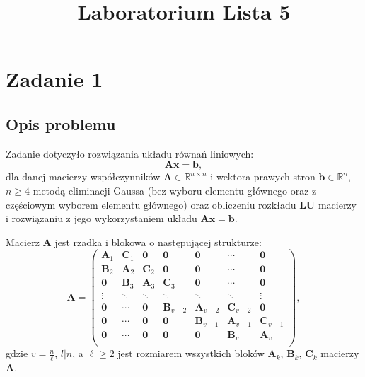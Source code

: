 \documentclass{classrep}
\author{
  \studentinfo{Agata Jasionowska}{229726}
}
\title{Laboratorium \ppauza Lista 5}
\newcommand{\mA}{\bm{A}}
\newcommand{\mB}{\bm{B}}
\newcommand{\mC}{\bm{C}}
\newcommand{\mL}{\bm{L}}
\newcommand{\mU}{\bm{U}}
\newcommand{\mZ}{\bm{0}}
\newcommand{\vb}{\bm{b}}
\newcommand{\vx}{\bm{x}}
\newcommand{\R}{\mathbb{R}}
\begin{document}
\maketitle

\section{Zadanie 1}	
	\subsection{Opis problemu}
		Zadanie dotyczyło rozwiązania układu równań liniowych:
		$$\mA\vx = \vb,$$
		dla danej macierzy współczynników $\mA \in \R^{n\times n}$ i wektora prawych stron $\vb \in \R^n$, $n \geq 4$ metodą eliminacji Gaussa 	(bez wyboru elementu głównego oraz z częściowym wyborem elementu głównego) oraz obliczeniu rozkładu $\mL \mU$ macierzy i rozwiązaniu z jego wykorzystaniem układu $\mA \vx = \vb$.
		
		Macierz $\mA$ jest rzadka i blokowa o następującej strukturze:
		$$
			\mA =
			\left(\begin{array}{ccccccc}
			\mA_1 & \mC_1 & \mZ & \mZ & \mZ & \cdots & \mZ \\
			\mB_2 & \mA_2 & \mC_2 & \mZ & \mZ  & \cdots & \mZ \\
			\mZ  & \mB_3 & \mA_3 & \mC_3 & \mZ  & \cdots & \mZ \\
			\vdots & \ddots & \ddots & \ddots & \ddots & \ddots & \vdots\\
			\mZ   & \cdots & \mZ  & \mB_{v-2} & \mA_{v-2} & \mC_{v-2} & \mZ \\
			\mZ  & \cdots & \mZ  &  \mZ &\mB_{v-1} & \mA_{v-1} & \mC_{v-1}  \\
			\mZ  & \cdots & \mZ & \mZ & \mZ& \mB_{v} & \mA_{v}  \\
			\end{array}\right),
		$$
		gdzie $v = \frac{n}{\ell}$, $l | n$, a $\ell \geq 2$ jest rozmiarem wszystkich bloków $\mA_k$, $\mB_k$, $\mC_k$ macierzy $\mA$. 
		
\end{document}
